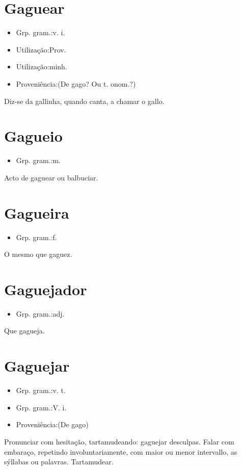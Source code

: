\section{Gaguear}
\begin{itemize}
\item {Grp. gram.:v. i.}
\end{itemize}
\begin{itemize}
\item {Utilização:Prov.}
\end{itemize}
\begin{itemize}
\item {Utilização:minh.}
\end{itemize}
\begin{itemize}
\item {Proveniência:(De \textunderscore gago\textunderscore ? Ou t. onom.?)}
\end{itemize}
Diz-se da gallinha, quando canta, a chamar o gallo.
\section{Gagueio}
\begin{itemize}
\item {Grp. gram.:m.}
\end{itemize}
Acto de gaguear ou balbuciar.
\section{Gagueira}
\begin{itemize}
\item {Grp. gram.:f.}
\end{itemize}
O mesmo que \textunderscore gaguez\textunderscore .
\section{Gaguejador}
\begin{itemize}
\item {Grp. gram.:adj.}
\end{itemize}
Que gagueja.
\section{Gaguejar}
\begin{itemize}
\item {Grp. gram.:v. t.}
\end{itemize}
\begin{itemize}
\item {Grp. gram.:V. i.}
\end{itemize}
\begin{itemize}
\item {Proveniência:(De \textunderscore gago\textunderscore )}
\end{itemize}
Pronunciar com hesitação, tartamudeando: \textunderscore gaguejar desculpas\textunderscore .
Falar com embaraço, repetindo involuntariamente, com maior ou menor intervallo, as sýllabas ou palavras.
Tartamudear.
